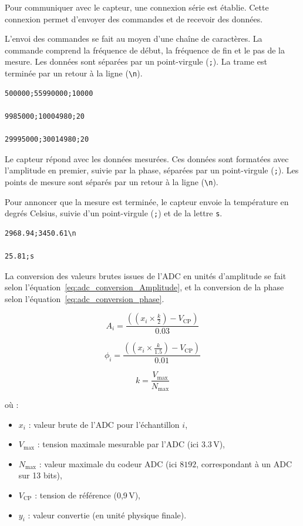 Pour communiquer avec le capteur, une connexion série est établie. Cette connexion permet d'envoyer des commandes et de recevoir des données.

L’envoi des commandes se fait au moyen d’une chaîne de caractères. La commande comprend la fréquence de début, la fréquence de fin et le pas de la mesure. Les données sont séparées par un point-virgule (\texttt{;}). La trame est terminée par un retour à la ligne (\texttt{\textbackslash n}).

\begin{verbatim}
500000;55990000;10000

9985000;10004980;20

29995000;30014980;20
\end{verbatim}

Le capteur répond avec les données mesurées. Ces données sont formatées avec l'amplitude en premier, suivie par la phase, séparées par un point-virgule (\texttt{;}). Les points de mesure sont séparés par un retour à la ligne (\texttt{\textbackslash n}).

Pour annoncer que la mesure est terminée, le capteur envoie la température en degrés Celsius, suivie d’un point-virgule (\texttt{;}) et de la lettre \texttt{s}.

\begin{verbatim}
2968.94;3450.61\n

25.81;s
\end{verbatim}

La conversion des valeurs brutes issues de l'ADC en unités d'amplitude se fait selon l'équation~\ref{eq:adc_conversion_Amplitude}, et la conversion de la phase selon l'équation~\ref{eq:adc_conversion_phase}.

\begin{equation}
A_i = \frac{\left( \left( x_i \times \frac{k}{2} \right) - V_{\text{CP}} \right)}{0.03}
\label{eq:adc_conversion_Amplitude}
\end{equation}

\begin{equation}
\phi_i = \frac{\left( \left( x_i \times \frac{k}{1.5} \right) - V_{\text{CP}} \right)}{0.01}
\label{eq:adc_conversion_phase}
\end{equation}

\begin{equation}
k = \frac{V_{\text{max}}}{N_{\text{max}}}
\label{eq:adc_conversion}
\end{equation}

où :
\begin{itemize}[label=\textbullet]
    \item $x_i$ : valeur brute de l'ADC pour l'échantillon $i$,
    \item $V_{\text{max}}$ : tension maximale mesurable par l'ADC (ici $3.3\,\mathrm{V}$),
    \item $N_{\text{max}}$ : valeur maximale du codeur ADC (ici $8192$, correspondant à un ADC sur 13 bits),
    \item $V_{\text{CP}}$ : tension de référence (0,9\,V),
    \item $y_i$ : valeur convertie (en unité physique finale).
\end{itemize}


